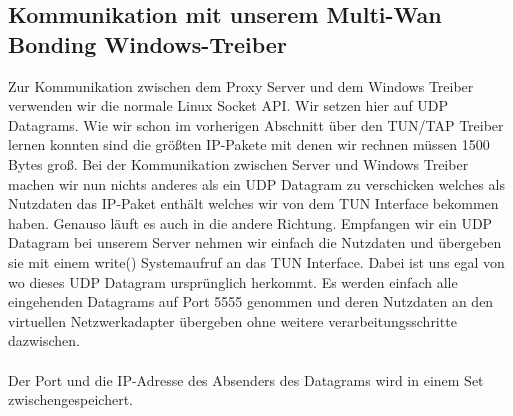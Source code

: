 \noindent
\begin{program}[H]
    \begin{CppCode}
        // Lesen von tun2 und schreiben in tun1 wenn Inhalt in tun2
        if(FD_ISSET(tun_fd2, &rd_set)) {
            nread = read(tun_fd2, buffer, sizeof(buffer));
            if(nread < 0) {
                perror("Lesen vom Interface");
                close(tun_fd1); close(tun_fd2);
                exit(1);
            }
            printf("Gelesen %

            nwrite = write(tun_fd1, buffer, nread);
            if(nwrite < 0) {
                perror("Schreiben zum Interface");
                close(tun_fd1); close(tun_fd2);
                exit(1);
            }
            printf("Geschrieben %
        }
    }
    \end{CppCode}
\end{program}
\noindent
\subsection{Kommunikation mit unserem Multi-Wan Bonding Windows-Treiber}
Zur Kommunikation zwischen dem Proxy Server und dem Windows Treiber verwenden wir die normale Linux Socket API. Wir setzen hier auf UDP Datagrams. Wie wir schon im vorherigen Abschnitt über den TUN/TAP Treiber lernen konnten sind die größten IP-Pakete mit denen wir rechnen müssen 1500 Bytes groß. Bei der Kommunikation zwischen Server und Windows Treiber machen wir nun nichts anderes als ein UDP Datagram zu verschicken welches als Nutzdaten das IP-Paket enthält welches wir von dem TUN Interface bekommen haben. Genauso läuft es auch in die andere Richtung. Empfangen wir ein UDP Datagram bei unserem Server nehmen wir einfach die Nutzdaten und übergeben sie mit einem write() Systemaufruf an das TUN Interface. Dabei ist uns egal von wo dieses UDP Datagram ursprünglich herkommt. Es werden einfach alle eingehenden Datagrams auf Port 5555 genommen und deren Nutzdaten an den virtuellen Netzwerkadapter übergeben ohne weitere verarbeitungsschritte dazwischen. 
\\\\
Der Port und die IP-Adresse des Absenders des Datagrams wird in einem Set zwischengespeichert. 